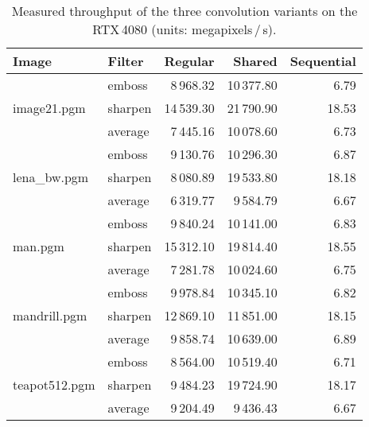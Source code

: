 \begin{table}[h]
  \centering
  \caption{Measured throughput of the three convolution variants on the RTX\,4080
           (units: megapixels\,/\,s).}
  \label{tab:conv_results}
  \begin{tabular}{llrrr}
    \toprule
    \textbf{Image} & \textbf{Filter} & \textbf{Regular} & \textbf{Shared} & \textbf{Sequential} \\
    \midrule
    \multirow{3}{*}{image21.pgm}  & emboss  &  8\,968.32 & 10\,377.80 &    6.79 \\
                                  & sharpen & 14\,539.30 & 21\,790.90 &   18.53 \\
                                  & average &  7\,445.16 & 10\,078.60 &    6.73 \\[2pt]
    \multirow{3}{*}{lena\_bw.pgm} & emboss  &  9\,130.76 & 10\,296.30 &    6.87 \\
                                  & sharpen &  8\,080.89 & 19\,533.80 &   18.18 \\
                                  & average &  6\,319.77 &  9\,584.79 &    6.67 \\[2pt]
    \multirow{3}{*}{man.pgm}      & emboss  &  9\,840.24 & 10\,141.00 &    6.83 \\
                                  & sharpen & 15\,312.10 & 19\,814.40 &   18.55 \\
                                  & average &  7\,281.78 & 10\,024.60 &    6.75 \\[2pt]
    \multirow{3}{*}{mandrill.pgm} & emboss  &  9\,978.84 & 10\,345.10 &    6.82 \\
                                  & sharpen & 12\,869.10 & 11\,851.00 &   18.15 \\
                                  & average &  9\,858.74 & 10\,639.00 &    6.89 \\[2pt]
    \multirow{3}{*}{teapot512.pgm}& emboss  &  8\,564.00 & 10\,519.40 &    6.71 \\
                                  & sharpen &  9\,484.23 & 19\,724.90 &   18.17 \\
                                  & average &  9\,204.49 &  9\,436.43 &    6.67 \\
    \bottomrule
  \end{tabular}
\end{table}

